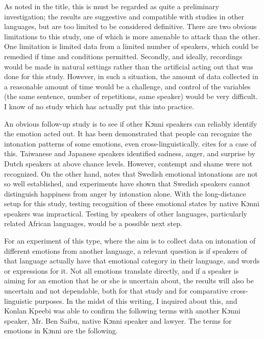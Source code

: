 \documentclass[output=paper]{langsci/langscibook}
\begin{document}
As noted in the title, this is must be regarded as quite a preliminary investigation; the results are suggestive and compatible with studies in other languages, but are too limited to be considered definitive. There are two obvious limitations to this study, one of which is more amenable to attack than the other. One limitation is limited data from a limited number of speakers, which could be remedied if time and conditions permitted. Secondly, and ideally, recordings would be made in natural settings rather than the artificial acting out that was done for this study. However, in such a situation, the amount of data collected in a reasonable amount of time would be a challenge, and control of the variables (the same sentence, number of repetitions, same speaker) would be very difficult. I know of no study which has actually put this into practice.

An obvious follow-up study is to see if other Kɔnni speakers can reliably identify the emotion acted out. It has been demonstrated that people can recognize the intonation patterns of some emotions, even cross-linguistically. \citet[72]{gussenhoven2004} cites \citet[128]{vanbezooijen1984} for a case of this. Taiwanese and Japanese speakers identified sadness, anger, and surprise by Dutch speakers at above chance levels. However, contempt and shame were not recognized. On the other hand, \citet[12]{garding1998} notes that Swedish emotional intonations are not so well established, and experiments have shown that Swedish speakers cannot distinguish happiness from anger by intonation alone. With the long-distance setup for this study, testing recognition of these emotional states by native Kɔnni speakers was impractical. Testing by speakers of other languages, particularly related African languages, would be a possible next step.

For an experiment of this type, where the aim is to collect data on intonation of different emotions from another language, a relevant question is if speakers of that language actually have that emotional category in their language, and words or expressions for it. Not all emotions translate directly, and if a speaker is aiming for an emotion that he or she is uncertain about, the results will also be uncertain and not dependable, both for that study and for comparative cross-linguistic purposes. In the midst of this writing, I inquired about this, and Konlan Kpeebi was able to confirm the following terms with another Kɔnni speaker, Mr. Ben Saibu, native Kɔnni speaker and lawyer. The terms for emotions in Kɔnni are the following.
\end{document}
